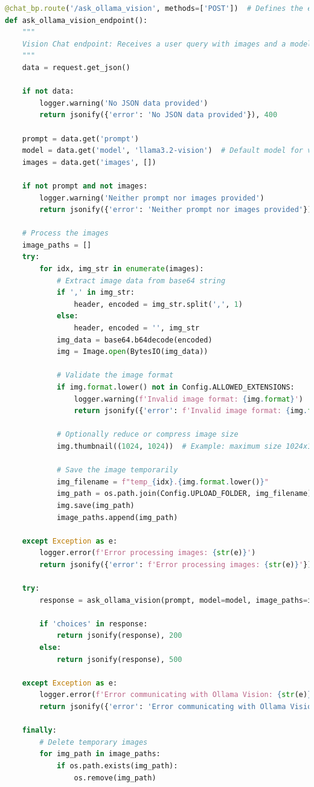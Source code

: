 \begin{lstlisting}[language=Python, caption={Image Recognition Endpoint}]
@chat_bp.route('/ask_ollama_vision', methods=['POST'])  # Defines the endpoint using POST method
def ask_ollama_vision_endpoint():
    """
    Vision Chat endpoint: Receives a user query with images and a model, communicates with Ollama Vision, and returns the response.
    """
    data = request.get_json()

    if not data:
        logger.warning('No JSON data provided')
        return jsonify({'error': 'No JSON data provided'}), 400

    prompt = data.get('prompt')
    model = data.get('model', 'llama3.2-vision')  # Default model for vision tasks
    images = data.get('images', [])

    if not prompt and not images:
        logger.warning('Neither prompt nor images provided')
        return jsonify({'error': 'Neither prompt nor images provided'}), 400

    # Process the images
    image_paths = []
    try:
        for idx, img_str in enumerate(images):
            # Extract image data from base64 string
            if ',' in img_str:
                header, encoded = img_str.split(',', 1)
            else:
                header, encoded = '', img_str
            img_data = base64.b64decode(encoded)
            img = Image.open(BytesIO(img_data))

            # Validate the image format
            if img.format.lower() not in Config.ALLOWED_EXTENSIONS:
                logger.warning(f'Invalid image format: {img.format}')
                return jsonify({'error': f'Invalid image format: {img.format}'}), 400

            # Optionally reduce or compress image size
            img.thumbnail((1024, 1024))  # Example: maximum size 1024x1024

            # Save the image temporarily
            img_filename = f"temp_{idx}.{img.format.lower()}"
            img_path = os.path.join(Config.UPLOAD_FOLDER, img_filename)
            img.save(img_path)
            image_paths.append(img_path)

    except Exception as e:
        logger.error(f'Error processing images: {str(e)}')
        return jsonify({'error': f'Error processing images: {str(e)}'}), 400

    try:
        response = ask_ollama_vision(prompt, model=model, image_paths=image_paths)

        if 'choices' in response:
            return jsonify(response), 200
        else:
            return jsonify(response), 500

    except Exception as e:
        logger.error(f'Error communicating with Ollama Vision: {str(e)}')
        return jsonify({'error': 'Error communicating with Ollama Vision'}), 500

    finally:
        # Delete temporary images
        for img_path in image_paths:
            if os.path.exists(img_path):
                os.remove(img_path)
\end{lstlisting}


